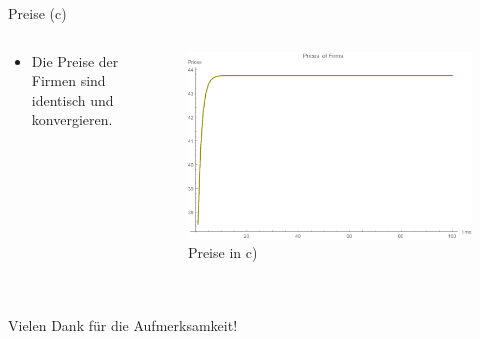 \documentclass[xcolor={dvipsnames},10pt]{beamer}
\begin{document}
\begin{frame}{Preise (c)}
\begin{columns}[T]
    \begin{column}{.3\textwidth}
      \begin{itemize}
      \item Die Preise der Firmen sind identisch und konvergieren.
      \end{itemize}
      \end{column}
      \begin{column}{.7\textwidth}
      \begin{figure}[t]
            \centering
            \includegraphics[scale=0.35]{../Plots/prices1c}
            \caption{Preise in c)}
            \label{fig:prices1c}
       \end{figure}
    \end{column}
  \end{columns}
\end{frame}

\section*{}
\begin{frame}
\centering
 Vielen Dank für die Aufmerksamkeit!
\end{frame}
\end{document}
